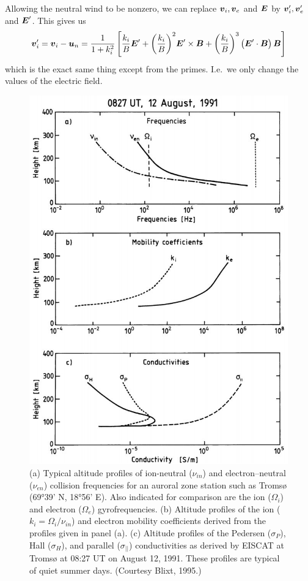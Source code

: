 Allowing the neutral wind to be nonzero, we can replace \(\boldsymbol{v}_i,\boldsymbol{v}_e\) and \(\boldsymbol{E}\) by \(\boldsymbol{v}_i',\boldsymbol{v}_e'\) and \(\boldsymbol{E}'\). This gives us
\begin{equation*}
    \boldsymbol{v}_i'=\boldsymbol{v}_i-\boldsymbol{u}_n=\frac{1}{1+k_i^2}\left[\frac{k_i}{B}\boldsymbol{E}'+{\left(\frac{k_i}{B}\right)}^2\boldsymbol{E}'\times\boldsymbol{B}+{\left(\frac{k_i}{B}\right)}^3\left(\boldsymbol{E}'\cdot\boldsymbol{B}\right)\boldsymbol{B}\right]
\end{equation*}
which is the exact same thing except from the primes. I.e.\ we only change the values of the electric field.
\begin{figure}[t]
    \centering
    \includegraphics[width=.6\linewidth]{bilder/L12_k_i_for_ion_and_electron.jpg}
    \caption{(a) Typical altitude profiles of ion-neutral (\(\nu_{in}\)) and electron–neutral (\(\nu_{en}\)) collision frequencies for an auroral zone station such as Tromsø (69\si{\degree}39' N, 18\si{\degree}56' E). Also indicated for comparison are the ion (\(\Omega_i\)) and electron (\(\Omega_e\)) gyrofrequencies. (b) Altitude profiles of the ion (\(k_i=\Omega_i/\nu_{in}\)) and electron mobility coefficients derived from the profiles given in panel (a). (c) Altitude profiles of the Pedersen (\(\sigma_P\)), Hall (\(\sigma_H\)), and parallel (\(\sigma_{||}\)) conductivities as derived by EISCAT at Tromsø at 08:27 UT on August 12, 1991. These profiles are typical of quiet summer days. (Courtesy Blixt, 1995.)}\label{fig:L12_k_i_for_ion_and_electron}
\end{figure}

